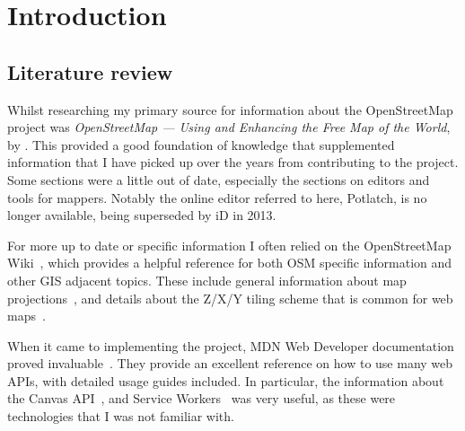 \documentclass[hyphens]{final_report}
\begin{document}


\chapter{Introduction}




\section{Literature review}

Whilst researching my primary source for information about the OpenStreetMap project was \emph{OpenStreetMap — Using and Enhancing the Free Map of the World}, by \textcite{RAMM:2011}. This provided a good foundation of knowledge that supplemented information that I have picked up over the years from contributing to the project. Some sections were a little out of date, especially the sections on editors and tools for mappers. Notably the online editor referred to here, Potlatch, is no longer available, being superseded by iD in 2013.

For more up to date or specific information I often relied on the OpenStreetMap Wiki~\cite{osm-wiki}, which provides a helpful reference for both OSM specific information and other GIS adjacent topics. These include general information about map projections~\cite{osm-wiki-mercator}, and details about the Z/X/Y tiling scheme that is common for web maps~\cite{osm-wiki-tile-names}.

When it came to implementing the project, MDN Web Developer documentation proved invaluable~\cite{mdn}. They provide an excellent reference on how to use many web APIs, with detailed usage guides included. In particular, the information about the Canvas API~\cite{mdn-canvas-api}, and Service Workers~\cite{mdn-service-workers} was very useful, as these were technologies that I was not familiar with.
\end{document}
